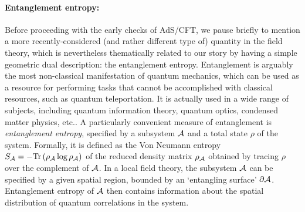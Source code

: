 \documentclass[12pt,a4paper]{article}
\def\AC{AdS/CFT}
\begin{document}
\paragraph{Entanglement entropy:}  %
Before proceeding with the early checks of \AC, we pause briefly to mention a more recently-considered (and rather different type of) quantity in the field theory, which is nevertheless thematically related to our story by having a simple geometric dual description: the entanglement entropy. Entanglement is arguably the most non-classical manifestation of quantum mechanics, 
which can be used as a resource for performing tasks that cannot be accomplished with classical resources, such as quantum teleportation.  It is actually used in a wide range of subjects, including quantum information theory, quantum optics, condensed matter physics, etc..  
A particularly convenient measure of entanglement is {\it entanglement entropy}, specified by a subsystem ${\cal A}$ and a total state $\rho$ of the system.  Formally, it is defined as the Von Neumann entropy $S_{{\cal A}} = - {\rm Tr} \left( \rho_{{\cal A}} \log \rho_{{\cal A}}\right)$ of the reduced density matrix $\rho_{{\cal A}}$ obtained by tracing $\rho$ over the complement of ${\cal A}$.  
In a local field theory, the subsystem ${\cal A}$ can be specified by a given spatial region, bounded by an `entangling surface' $\partial {\cal A}$.  Entanglement entropy of ${\cal A}$ then contains information  about the spatial distribution of quantum correlations in the system.
\end{document}
